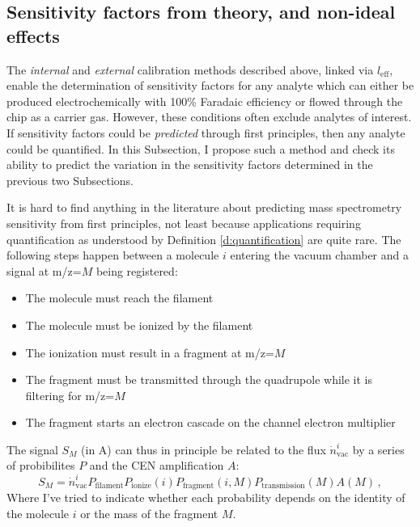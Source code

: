 \subsection{Sensitivity factors from theory, and non-ideal effects}\label{subsec:MS_theory}

The \textit{internal} and \textit{external} calibration methods described above, linked via $l_\text{eff}$, enable the determination of sensitivity factors for any analyte which can either be produced electrochemically with 100\% Faradaic efficiency or flowed through the chip as a carrier gas. However, these conditions often exclude analytes of interest. If sensitivity factors could be \textit{predicted} through first principles, then any analyte could be quantified. In this Subsection, I propose such a method and check its ability to predict the variation in the sensitivity factors determined in the previous two Subsections.

It is hard to find anything in the literature about predicting mass spectrometry sensitivity from first principles, not least because applications requiring quantification as understood by Definition \ref{d:quantification} are quite rare. The following steps happen between a molecule $i$ entering the vacuum chamber and a signal at m/z=$M$ being registered\cite{Gross2007, Douglas2009}:
\begin{itemize}
	\item
	The molecule must reach the filament
	\item
	The molecule must be ionized by the filament
	\item
	The ionization must result in a fragment at m/z=$M$
	\item
	The fragment must be transmitted through the quadrupole while it is filtering for m/z=$M$
	\item
	The fragment starts an electron cascade on the channel electron multiplier
\end{itemize}
The signal $S_M$ (in A) can thus in principle be related to the flux $\dot{n}^i_\text{vac}$ by a series of probibilites $P$ and the CEN amplification $A$:
\begin{equation}
S_M = \dot{n}^i_\text{vac} P_\text{filament} P_\text{ionize}(i) P_\text{fragment}(i, M) P_\text{transmission}(M) A(M)\,,
\end{equation}
Where I've tried to indicate whether each probability depends on the identity of the molecule $i$ or the mass of the fragment $M$.

